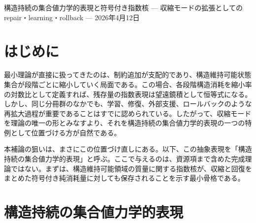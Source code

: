 \documentclass[12pt,a4paper]{article}
\begin{document}
\PaperTitleBlock
  {構造持続の集合値力学的表現と符号付き指数核}
  {— 収縮モードの拡張としての repair・learning・rollback —}
  {2026年4月12日}

\begin{abstract}
本補論の目的は、これまで主に収縮モードとして定式化してきた構造持続理論を、再拡大作用を含む集合値時間発展の表現へ拡張するための最小骨格を与えることである。現行の最小理論では、制約追加モデル

\[
V^{(i)} = V^{(i-1)} \cap C_{i}
\]

のもとで、構造維持可能状態集合の逐次縮小から指数型

\[
m(V^{(n)}) = m(V^{(0)}) e^{-L_{n}}
\]

が導かれる。しかし現実の系では、学習・修復・冗長化・外部支援・ロールバックのように、構造維持可能領域を再拡大しうる作用が重要になる。本補論では、各段階を収縮作用と再拡大作用の合成として与え、構造消耗量と回復量を同じ対数尺度で定義することで、累積純消耗量

\[
B_{n} = L_{n} - R_{n}^{\mathrm{rec}}
\]

に対する指数核

\[
m(V^{(n)}) = m(V^{(0)}) e^{-B_{n}}
\]

を与える。これにより、収縮モードは構造持続の集合値力学的表現の特例として回収される。
\end{abstract}

\section{はじめに}\label{ux306fux3058ux3081ux306b}

最小理論が直接に扱ってきたのは、制約追加が支配的であり、構造維持可能状態集合が段階ごとに縮小していく局面である。この場合、各段階構造消耗を縮小率の対数比として定義すれば、残存量の指数表現は望遠鏡積として恒等式になる。しかし、同じ分冊群のなかでも、学習、修復、外部支援、ロールバックのような再拡大過程が重要であることはすでに認められている。したがって、収縮モードを理論の唯一の形とみなすより、それを構造持続の集合値力学的表現の一つの特例として位置づける方が自然である。

本補論の狙いは、まさにこの位置づけ直しにある。以下、この抽象表現を「構造持続の集合値力学的表現」と呼ぶ。ここで与えるのは、資源項まで含めた完成理論ではない。まずは、構造維持可能領域の質量に関する指数核が、収縮と回復をまとめた符号付き純消耗量に対しても保存されることを示す最小骨格である。

\section{構造持続の集合値力学的表現}\label{ux69cbux9020ux6301ux7d9aux306eux96c6ux5408ux5024ux529bux5b66ux7684ux8868ux73fe}
\end{document}
